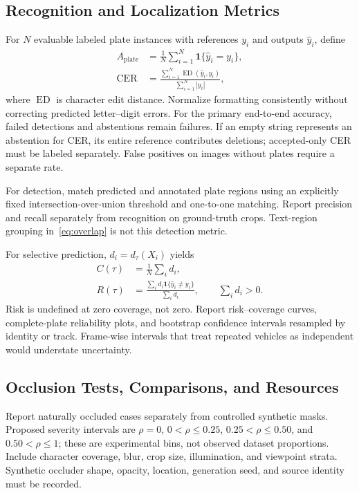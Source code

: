 \documentclass[journal]{IEEEtran}
\newcommand{\ind}{\mathbf{1}}
\begin{document}
\subsection{Recognition and Localization Metrics}
For $N$ evaluable labeled plate instances with references $y_i$ and outputs $\widehat y_i$, define
\begin{align}
 A_{\mathrm{plate}}&=\frac{1}{N}\sum_{i=1}^{N}\ind\{\widehat y_i=y_i\},\label{eq:accuracy}\\
 \mathrm{CER}&=\frac{\sum_{i=1}^{N}\operatorname{ED}(\widehat y_i,y_i)}
 {\sum_{i=1}^{N}|y_i|},\label{eq:cer}
\end{align}
where $\operatorname{ED}$ is character edit distance. Normalize formatting consistently without correcting predicted letter--digit errors. For the primary end-to-end accuracy, failed detections and abstentions remain failures. If an empty string represents an abstention for CER, its entire reference contributes deletions; accepted-only CER must be labeled separately. False positives on images without plates require a separate rate.

For detection, match predicted and annotated plate regions using an explicitly fixed intersection-over-union threshold and one-to-one matching. Report precision and recall separately from recognition on ground-truth crops. Text-region grouping in~\eqref{eq:overlap} is not this detection metric.

For selective prediction, $d_i=d_\tau(X_i)$ yields
\begin{align}
 C(\tau)&=\frac{1}{N}\sum_i d_i,\label{eq:coverage}\\
 R(\tau)&=\frac{\sum_i d_i\ind\{\widehat y_i\ne y_i\}}
 {\sum_i d_i},\qquad \sum_i d_i>0.\label{eq:risk}
\end{align}
Risk is undefined at zero coverage, not zero. Report risk--coverage curves, complete-plate reliability plots, and bootstrap confidence intervals resampled by identity or track. Frame-wise intervals that treat repeated vehicles as independent would understate uncertainty.

\subsection{Occlusion Tests, Comparisons, and Resources}
Report naturally occluded cases separately from controlled synthetic masks. Proposed severity intervals are $\rho=0$, $0<\rho\leq0.25$, $0.25<\rho\leq0.50$, and $0.50<\rho\leq1$; these are experimental bins, not observed dataset proportions. Include character coverage, blur, crop size, illumination, and viewpoint strata. Synthetic occluder shape, opacity, location, generation seed, and source identity must be recorded.
\end{document}
